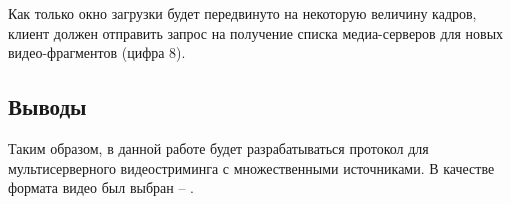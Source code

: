 Как только окно загрузки будет передвинуто на некоторую величину кадров, клиент должен отправить запрос на получение списка медиа-серверов для новых видео-фрагментов (цифра 8). \\

\subsection*{Выводы}
Таким образом, в данной работе будет разрабатываться протокол для мультисерверного видеостриминга с множественными источниками. В качестве формата видео был выбран -- .

















